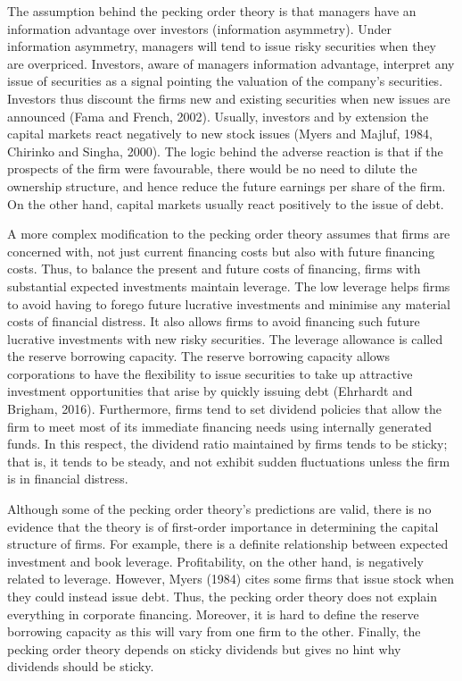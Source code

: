 \documentclass[a4paper, nobind]{templates/ociamthesis}
\begin{document}
The assumption behind the pecking order theory is that managers have an information advantage over investors (information asymmetry). Under information asymmetry, managers will tend to issue risky securities when they are overpriced. Investors, aware of managers information advantage, interpret any issue of securities as a signal pointing the valuation of the company's securities. Investors thus discount the firms new and existing securities when new issues are announced (Fama and French, 2002). Usually, investors and by extension the capital markets react negatively to new stock issues (Myers and Majluf, 1984, Chirinko and Singha, 2000). The logic behind the adverse reaction is that if the prospects of the firm were favourable, there would be no need to dilute the ownership structure, and hence reduce the future earnings per share of the firm. On the other hand, capital markets usually react positively to the issue of debt.

A more complex modification to the pecking order theory assumes that firms are concerned with, not just current financing costs but also with future financing costs. Thus, to balance the present and future costs of financing, firms with substantial expected investments maintain leverage. The low leverage helps firms to avoid having to forego future lucrative investments and minimise any material costs of financial distress. It also allows firms to avoid financing such future lucrative investments with new risky securities.
The leverage allowance is called the reserve borrowing capacity. The reserve borrowing capacity allows corporations to have the flexibility to issue securities to take up attractive investment opportunities that arise by quickly issuing debt (Ehrhardt and Brigham, 2016). Furthermore, firms tend to set dividend policies that allow the firm to meet most of its immediate financing needs using internally generated funds. In this respect, the dividend ratio maintained by firms tends to be sticky; that is, it tends to be steady, and not exhibit sudden fluctuations unless the firm is in financial distress.

Although some of the pecking order theory's predictions are valid, there is no evidence that the theory is of first-order importance in determining the capital structure of firms. For example, there is a definite relationship between expected investment and book leverage. Profitability, on the other hand, is negatively related to leverage. However, Myers (1984) cites some firms that issue stock when they could instead issue debt. Thus, the pecking order theory does not explain everything in corporate financing.
Moreover, it is hard to define the reserve borrowing capacity as this will vary from one firm to the other. Finally, the pecking order theory depends on sticky dividends but gives no hint why dividends should be sticky.
\end{document}
